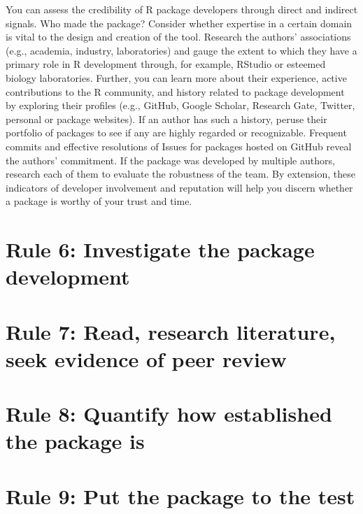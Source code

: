 \documentclass[10pt,letterpaper]{article}
\begin{document}
You can assess the credibility of R package developers through direct
and indirect signals. Who made the package? Consider whether expertise
in a certain domain is vital to the design and creation of the tool.
Research the authors' associations (e.g., academia, industry,
laboratories) and gauge the extent to which they have a primary role in
R development through, for example, RStudio or esteemed biology
laboratories. Further, you can learn more about their experience, active
contributions to the R community, and history related to package
development by exploring their profiles (e.g., GitHub, Google Scholar,
Research Gate, Twitter, personal or package websites). If an author has
such a history, peruse their portfolio of packages to see if any are
highly regarded or recognizable. Frequent commits and effective
resolutions of Issues for packages hosted on GitHub reveal the authors'
commitment. If the package was developed by multiple authors, research
each of them to evaluate the robustness of the team. By extension, these
indicators of developer involvement and reputation will help you discern
whether a package is worthy of your trust and time.

\hypertarget{rule-6-investigate-the-package-development}{%
\section{Rule 6: Investigate the package
development}\label{rule-6-investigate-the-package-development}}

\hypertarget{rule-7-read-research-literature-seek-evidence-of-peer-review}{%
\section{Rule 7: Read, research literature, seek evidence of peer
review}\label{rule-7-read-research-literature-seek-evidence-of-peer-review}}

\hypertarget{rule-8-quantify-how-established-the-package-is}{%
\section{Rule 8: Quantify how established the package
is}\label{rule-8-quantify-how-established-the-package-is}}

\hypertarget{rule-9-put-the-package-to-the-test}{%
\section{Rule 9: Put the package to the
test}\label{rule-9-put-the-package-to-the-test}}
\end{document}
